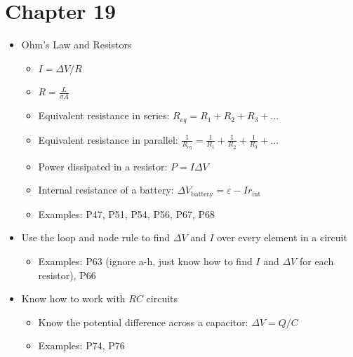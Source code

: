 \documentclass{article}
\begin{document}
\section*{Chapter 19}
\begin{itemize}
	\item Ohm's Law and Resistors
	\begin{itemize}
		\item $I = \Delta V / R$
		\item $R = \frac{L}{\sigma A}$
		\item Equivalent resistance in series: $R_{eq} = R_1 + R_2 + R_3 + ...$
		\item Equivalent resistance in parallel: $\frac{1}{R_{eq}}=\frac{1}{R_1} + \frac{1}{R_2} + \frac{1}{R_3} + ...$
		\item Power dissipated in a resistor: $P=I\Delta V$
		\item Internal resistance of a battery: $\Delta V_\mathrm{battery} = \varepsilon - Ir_\mathrm{int}$
		\item Examples: P47, P51, P54, P56, P67, P68
	\end{itemize}
	\item Use the loop and node rule to find $\Delta V$ and $I$ over every element in a circuit
	\begin{itemize}
		\item Examples: P63 (ignore a-h, just know how to find $I$ and $\Delta V$ for each resistor), P66
	\end{itemize}
	\item Know how to work with $RC$ circuits
	\begin{itemize}
		\item Know the potential difference across a capacitor: $\Delta V= Q/C$
		\item Examples: P74, P76
	\end{itemize}
\end{itemize}
\end{document}
